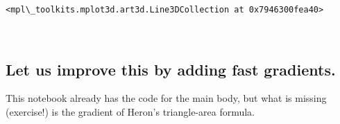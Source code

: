 \documentclass[11pt]{article}
\makeatletter
\newcommand{\boxspacing}{\kern\kvtcb@left@rule\kern\kvtcb@boxsep}
\newcommand{\prompt}[4]{
        {\ttfamily\llap{{\color{#2}[#3]:\hspace{3pt}#4}}\vspace{-\baselineskip}}
    }
\makeatother
\begin{document}
            \begin{tcolorbox}[breakable, size=fbox, boxrule=.5pt, pad at break*=1mm, opacityfill=0]
\prompt{Out}{outcolor}{ }{\boxspacing}
\begin{Verbatim}[commandchars=\\\{\}]
<mpl\_toolkits.mplot3d.art3d.Line3DCollection at 0x7946300fea40>
\end{Verbatim}
\end{tcolorbox}
        
    \begin{center}
    \end{center}
    { \hspace*{\fill} \\}
    
    \hypertarget{let-us-improve-this-by-adding-fast-gradients.}{%
\subsection{Let us improve this by adding fast
gradients.}\label{let-us-improve-this-by-adding-fast-gradients.}}

This notebook already has the code for the main body, but what is
missing (exercise!) is the gradient of Heron's triangle-area formula.
\end{document}
